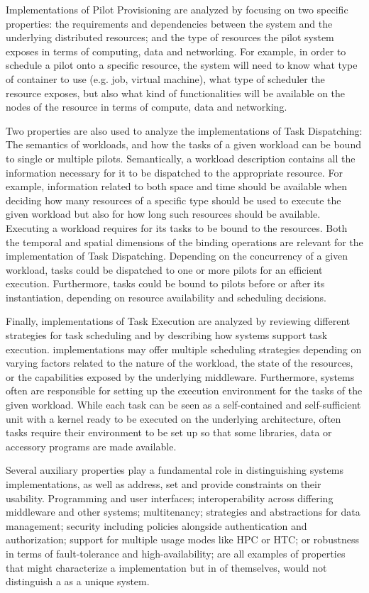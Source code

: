 \documentclass{sig-alternate}
\begin{document}
Implementations of Pilot Provisioning are analyzed by focusing on two
specific properties: the requirements and dependencies between the
\pilot system and the underlying distributed resources; and the type
of resources the pilot system exposes in terms of computing, data and
networking. For example, in order to schedule a pilot onto a specific
resource, the \pilot system will need to know what type of container
to use (e.g. job, virtual machine), what type of scheduler the
resource exposes, but also what kind of functionalities will be
available on the nodes of the resource in terms of compute, data and
networking.

Two properties are also used to analyze the implementations of Task
Dispatching: The semantics of workloads, and how the tasks of a given workload
can be bound to single or multiple pilots. Semantically, a workload description
contains all the information necessary for it to be dispatched to the
appropriate resource. For example, information related to both space and time
should be available when deciding how many resources of a specific type should
be used to execute the given workload but also for how long such resources
should be available. Executing a workload requires for its tasks to be bound to
the resources. Both the temporal and spatial dimensions of the binding
operations are relevant for the implementation of Task Dispatching. Depending
on the concurrency of a given workload, tasks could be dispatched to one or
more pilots for an efficient execution. Furthermore, tasks could be bound to
pilots before or after its instantiation, depending on resource availability
and scheduling decisions.

Finally, implementations of Task Execution are analyzed by reviewing different
strategies for task scheduling and by describing how \pilot systems support
task execution. \pilot implementations may offer multiple scheduling
strategies depending on varying factors related to the nature of the workload,
the state of the resources, or the capabilities exposed by the underlying
middleware. Furthermore, \pilot systems often are responsible for setting up
the execution environment for the tasks of the given workload. While each task
can be seen as a self-contained and self-sufficient unit with a kernel ready to
be executed on the underlying architecture, often tasks require their
environment to be set up so that some libraries, data or accessory programs
are made available.

Several auxiliary properties play a fundamental role in distinguishing
\pilot systems implementations, as well as address, set and provide
constraints on their usability.  Programming and user interfaces;
interoperability across differing middleware and other \pilot systems;
multitenancy; strategies and abstractions for data management;
security including policies alongside authentication and
authorization; support for multiple usage modes like HPC or HTC; or
robustness in terms of fault-tolerance and high-availability; are all
examples of properties that might characterize a \pilot implementation
but in of themselves, would not distinguish a \pilot as a unique
system.
\end{document}

